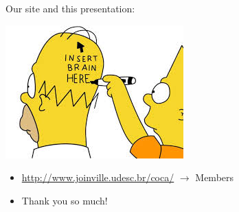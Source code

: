 \documentclass{beamer}
\begin{document}
\begin{frame}{Our site and this presentation:}


  
  \begin{center}
   \includegraphics[scale=0.6,keepaspectratio]{images/simpsons.jpg} 
  \end{center} 
  

\begin{itemize}
  \item \url{http://www.joinville.udesc.br/coca/} $\rightarrow $ Members

  \item Thank you so much!
\end{itemize}




\end{frame}
\end{document}
